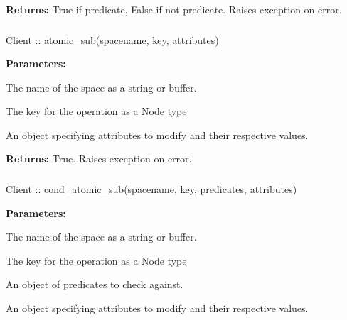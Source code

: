 \noindent\textbf{Returns:}
True if predicate, False if not predicate.  Raises exception on error.

\subsubsection{}
\label{api:nodejs:atomic_sub}
\begin{javascriptcode}
Client :: atomic_sub(spacename, key, attributes)
\end{javascriptcode}
\funcdesc 

\noindent\textbf{Parameters:}
\begin{description}[labelindent=\widthof{{\code{attributes}}},leftmargin=*,noitemsep,nolistsep,align=right]
\item[\code{spacename}] The name of the space as a string or buffer.
\item[\code{key}] The key for the operation as a Node type
\item[\code{attributes}] An object specifying attributes to modify and their respective values.
\end{description}

\noindent\textbf{Returns:}
True.  Raises exception on error.

\subsubsection{}
\label{api:nodejs:cond_atomic_sub}
\begin{javascriptcode}
Client :: cond_atomic_sub(spacename, key, predicates, attributes)
\end{javascriptcode}
\funcdesc 

\noindent\textbf{Parameters:}
\begin{description}[labelindent=\widthof{{\code{predicates}}},leftmargin=*,noitemsep,nolistsep,align=right]
\item[\code{spacename}] The name of the space as a string or buffer.
\item[\code{key}] The key for the operation as a Node type
\item[\code{predicates}] An object of predicates to check against.
\item[\code{attributes}] An object specifying attributes to modify and their respective values.
\end{description}

